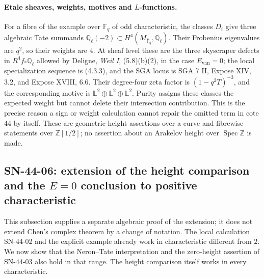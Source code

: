 \paragraph{Etale sheaves, weights, motives and $L$-functions.}
For a fibre of the example over $\mathbb F_q$ of odd characteristic,
the classes $D_i$ give three algebraic Tate summands
$\mathbb Q_\ell(-2)\subset H^4(M_{\overline{\mathbb F}_q},\mathbb Q_\ell)$.
Their Frobenius eigenvalues are $q^2$, so their weights are $4$.
At sheaf level these are the three skyscraper defects in
$R^4f_*\mathbb Q_\ell$ allowed by Deligne, \emph{Weil I},
(5.8)(b)(2), in the case $E_{\mathrm{van}}=0$; the local
specialization sequence is (4.3.3), and the SGA locus is SGA 7 II,
Expose XIV, 3.2, and Expose XVIII, 6.6.  Their degree-four zeta
factor is $(1-q^2T)^{-3}$, and the corresponding motive is
$\mathbb L^2\oplus\mathbb L^2\oplus\mathbb L^2$.
Purity assigns these classes the expected weight but cannot delete
their intersection contribution.  This is the precise reason a
sign or weight calculation cannot repair the omitted term in
cote 44 by itself.  These are geometric height assertions over a
curve and fibrewise statements over $\mathbb Z[1/2]$; no assertion
about an Arakelov height over $\operatorname{Spec}\mathbb Z$ is made.

\subsection{SN-44-06: extension of the height comparison and the
\texorpdfstring{$E=0$}{E=0} conclusion to positive characteristic}
\label{sn:44-06}

This subsection supplies a separate algebraic proof of the extension;
it does not extend Chen's complex theorem by a change of notation.
The local calculation SN-44-02 and the explicit example already work
in characteristic different from $2$.  We now show that the
Neron--Tate interpretation and the zero-height assertion of SN-44-03
also hold in that range.  The height comparison itself works in every
characteristic.

